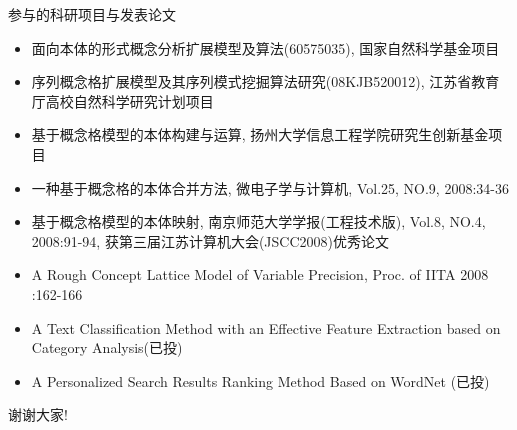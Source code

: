 \documentclass[dvipdfm]{beamer}
\begin{document}
\begin{frame}[t]{}
  \begin{block}{参与的科研项目与发表论文}
    \begin{itemize}
    \item \small{面向本体的形式概念分析扩展模型及算法(60575035), 国家自然科学基金项目}
    \item \small{序列概念格扩展模型及其序列模式挖掘算法研究(08KJB520012), 江苏省教育厅高校自然科学研究计划项目}
    \item \small{基于概念格模型的本体构建与运算, 扬州大学信息工程学院研究生创新基金项目}
    \item \small{一种基于概念格的本体合并方法, 微电子学与计算机, Vol.25, NO.9, 2008:34-36}
    \item \small{基于概念格模型的本体映射, 南京师范大学学报(工程技术版), Vol.8, NO.4, 2008:91-94, 获第三届江苏计算机大会(JSCC2008)优秀论文}
    \item \small{A Rough Concept Lattice Model of Variable Precision, Proc. of IITA 2008 :162-166}
    \item \small{A Text Classification Method with an Effective Feature Extraction based on Category Analysis(已投)}
    \item \small{A Personalized Search Results Ranking Method Based on WordNet (已投)}
    \end{itemize}
  \end{block}
\end{frame}

\begin{frame}{}
\begin{center}\huge{谢谢大家!}\end{center}
\end{frame}
\end{document}
